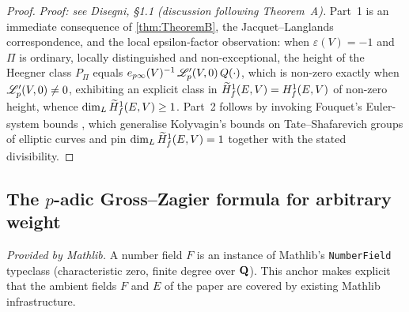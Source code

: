 \begin{proof}
  \textit{Proof: see Disegni, §1.1 (discussion following Theorem~A).}
  Part~1 is an immediate consequence of \cref{thm:TheoremB}, the
  Jacquet--Langlands correspondence, and the local epsilon-factor
  observation: when $\varepsilon(V) = -1$ and $\Pi$ is ordinary,
  locally distinguished and non-exceptional, the height of the Heegner
  class $P_\Pi$ equals $e_{p\infty}(V)^{-1}\,\mathscr{L}_p'(V,0)\,Q(\cdot)$,
  which is non-zero exactly when $\mathscr{L}_p'(V,0) \neq 0$, exhibiting an
  explicit class in $\widetilde{H}^1_f(E,V) = H^1_f(E,V)$ of non-zero height,
  whence $\dim_L \widetilde{H}^1_f(E,V) \geq 1$.  Part~2 follows by invoking
  Fouquet's Euler-system bounds \cite{fouquet}, which generalise
  Kolyvagin's bounds on Tate--Shafarevich groups of elliptic curves and
  pin $\dim_L \widetilde{H}^1_f(E,V) = 1$ together with the stated divisibility.
\end{proof}

\subsection{The $p$-adic Gross--Zagier formula for arbitrary weight}

\begin{lemma}
  \label{lem:NumberField_mathlib}
  \mathlibok
  \uses{}
  \textit{Provided by Mathlib.}
  A number field $F$ is an instance of Mathlib's \texttt{NumberField}
  typeclass (characteristic zero, finite degree over $\mathbf{Q}$).  This
  anchor makes explicit that the ambient fields $F$ and $E$ of the
  paper are covered by existing Mathlib infrastructure.
\end{lemma}

